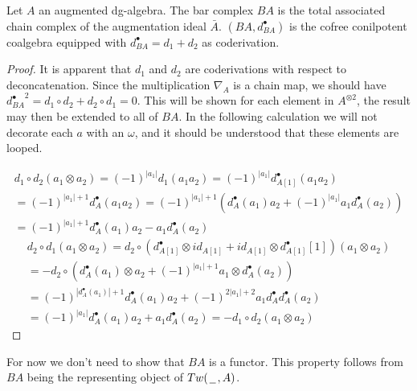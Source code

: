 \documentclass[../thesis.tex]{subfiles}
\begin{document}
            \begin{proposition}
                Let $A$ an augmented dg-algebra. The bar complex $BA$ is the total associated chain complex of the augmentation ideal $\bar{A}$. $(BA, d_{BA}^\bullet)$ is the cofree conilpotent coalgebra equipped with $d_{BA}^\bullet = d_1 + d_2$ as coderivation.
            \end{proposition}

            \begin{proof}
                    It is apparent that $d_1$ and $d_2$ are coderivations with respect to deconcatenation. Since the multiplication $\nabla_A$ is a chain map, we should have ${d_{BA}^\bullet}^2 = d_1 \circ d_2 + d_2 \circ d_1= 0$. This will be shown for each element in $A^{\otimes 2}$, the result may then be extended to all of $BA$. In the following calculation we will not decorate each $a$ with an $\omega$, and it should be understood that these elements are looped.

                \begin{multline*}
                    d_1 \circ d_2 (a_1\otimes a_2) = (-1)^{|a_1|}d_1 (a_1a_2) = (-1)^{|a_1|}d_{A[1]}^\bullet(a_1a_2) \\ = (-1)^{|a_1|+1}d_A^\bullet(a_1a_2) = (-1)^{|a_1|+1}(d_A^\bullet(a_1)a_2 + (-1)^{|a_1|}a_1d_A^\bullet(a_2)) \\ = (-1)^{|a_1|+1}d_A^\bullet(a_1)a_2 - a_1d_A^\bullet(a_2)
                \end{multline*}
                \begin{multline*}
                    d_2\circ d_1 (a_1\otimes a_2) = d_2\circ (d_{A[1]}^\bullet\otimes id_{A[1]} + id_{A[1]}\otimes d_{A[1]}^\bullet[1]) (a_1\otimes a_2) \\ = -d_2 \circ (d_A^\bullet(a_1)\otimes a_2 + (-1)^{|a_1|+1}a_1\otimes d_A^\bullet(a_2)) \\ = (-1)^{|d_A^\bullet(a_1)|+1}d_A^\bullet(a_1)a_2 + (-1)^{2|a_1|+2}a_1d_A^\bullet d_A^\bullet(a_2) \\ = (-1)^{|a_1|}d_A^\bullet(a_1)a_2 + a_1d_A^\bullet (a_2) = -d_1\circ d_2 (a_1\otimes a_2)
                \end{multline*}
            \end{proof}

            \begin{remark}
                For now we don't need to show that $BA$ is a functor. This property follows from $BA$ being the representing object of $Tw(\hspace{0.05cm}\underline{\hspace{0.2cm}}\hspace{0.05cm},A)$.
            \end{remark}
\end{document}
